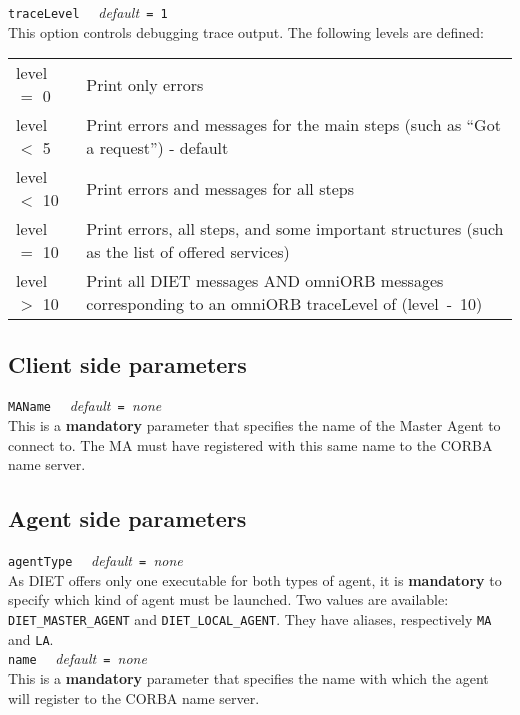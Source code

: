 \noindent
\texttt{traceLevel} \ \ \emph{default}\texttt{ = 1}\\
This option controls debugging trace output. The following levels are defined:

\begin{center}
 \footnotesize
 \begin{tabular}{p{.1\linewidth}p{.8\linewidth}}
  level $=$ 0  & Print only errors\\
  level $<$ 5  & Print errors and messages for the main steps (such as ``Got a
  request'') - default\\
  level $<$ 10 & Print errors and messages for all steps\\
  level $=$ 10 & Print errors, all steps, and some important structures (such
  as the list of offered services)\\
  level $>$ 10 & Print all DIET messages AND omniORB messages corresponding to
  an omniORB traceLevel of (level~-~10)
 \end{tabular}
\end{center}


\subsection{Client side parameters}

\noindent
\texttt{MAName} \ \ \emph{default}\texttt{ = }\emph{none}\\
This is a \textbf{mandatory} parameter that specifies the name of the Master
Agent to connect to. The MA must have registered with this same name to the
CORBA name server.


\subsection{Agent side parameters}

\noindent
\texttt{agentType} \ \ \emph{default}\texttt{ = }\emph{none}\\
As DIET offers only one executable for both types of agent, it is
\textbf{mandatory} to specify which kind of agent must be launched. Two values
are available: \texttt{DIET\_MASTER\_AGENT} and \texttt{DIET\_LOCAL\_AGENT}.
They have aliases, respectively \texttt{MA} and \texttt{LA}.
\\

\noindent
\texttt{name} \ \ \emph{default}\texttt{ = }\emph{none}\\
This is a \textbf{mandatory} parameter that specifies the name with
which the agent will register to the CORBA name server.


